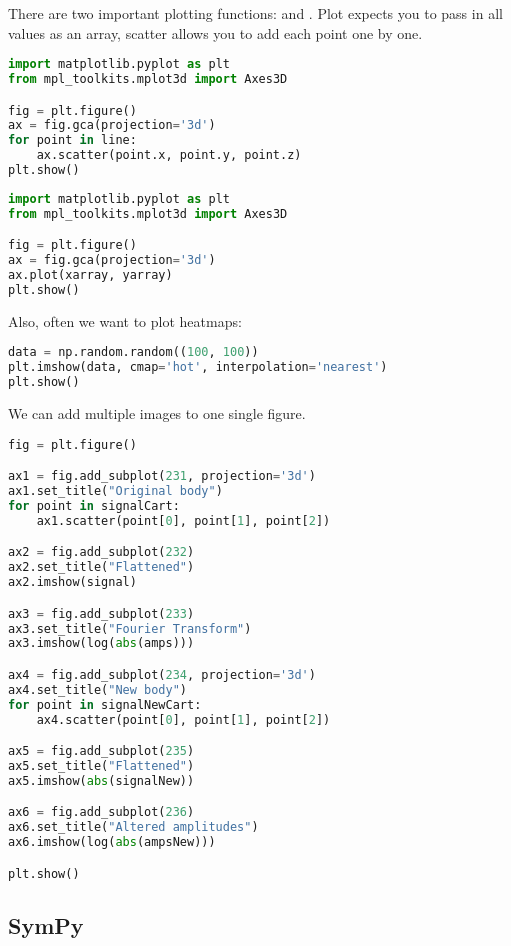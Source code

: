 There are two important plotting functions:  and . Plot expects you to pass in all values as an array, scatter allows you to add each point one by one. 

\begin{lstlisting}[language=python]
import matplotlib.pyplot as plt
from mpl_toolkits.mplot3d import Axes3D

fig = plt.figure()
ax = fig.gca(projection='3d')
for point in line:
    ax.scatter(point.x, point.y, point.z)
plt.show()
\end{lstlisting}

\begin{lstlisting}[language=python]
import matplotlib.pyplot as plt
from mpl_toolkits.mplot3d import Axes3D

fig = plt.figure()
ax = fig.gca(projection='3d')
ax.plot(xarray, yarray)
plt.show()
\end{lstlisting}

Also, often we want to plot heatmaps: 
\begin{lstlisting}[language=python]
data = np.random.random((100, 100))
plt.imshow(data, cmap='hot', interpolation='nearest')
plt.show()
\end{lstlisting}

We can add multiple images to one single figure. 
\begin{lstlisting}[language=python]
fig = plt.figure()

ax1 = fig.add_subplot(231, projection='3d')
ax1.set_title("Original body")
for point in signalCart:
    ax1.scatter(point[0], point[1], point[2])

ax2 = fig.add_subplot(232)
ax2.set_title("Flattened")
ax2.imshow(signal)

ax3 = fig.add_subplot(233)
ax3.set_title("Fourier Transform")
ax3.imshow(log(abs(amps)))

ax4 = fig.add_subplot(234, projection='3d')
ax4.set_title("New body")
for point in signalNewCart:
    ax4.scatter(point[0], point[1], point[2])

ax5 = fig.add_subplot(235)
ax5.set_title("Flattened")
ax5.imshow(abs(signalNew))

ax6 = fig.add_subplot(236)
ax6.set_title("Altered amplitudes")
ax6.imshow(log(abs(ampsNew)))

plt.show()
\end{lstlisting}

\subsection{SymPy}


